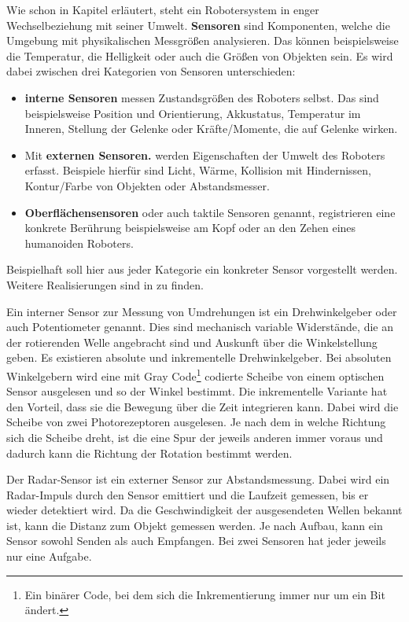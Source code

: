Wie schon in Kapitel  erläutert, steht ein Robotersystem in enger Wechselbeziehung mit seiner Umwelt. \textbf{Sensoren} sind Komponenten, welche die Umgebung mit physikalischen Messgrößen analysieren. Das können beispielsweise die Temperatur, die Helligkeit oder auch die Größen von Objekten sein. Es wird dabei zwischen drei Kategorien von Sensoren unterschieden:
\begin{itemize}
\item \textbf{interne Sensoren} messen Zustandsgrößen des Roboters selbst. Das sind beispielsweise Position und Orientierung, Akkustatus, Temperatur im Inneren, Stellung der Gelenke oder Kräfte/Momente, die auf Gelenke wirken.
\item Mit \textbf{externen Sensoren.} werden Eigenschaften der Umwelt des Roboters erfasst. Beispiele hierfür sind Licht, Wärme, Kollision mit Hindernissen, Kontur/Farbe von Objekten oder Abstandsmesser. 
\item \textbf{Oberflächensensoren} oder auch taktile Sensoren genannt, registrieren eine konkrete Berührung beispielsweise am Kopf oder an den Zehen eines humanoiden Roboters.
\end{itemize}
Beispielhaft soll hier aus jeder Kategorie ein konkreter Sensor vorgestellt werden. Weitere Realisierungen sind in \cite{Haun2007} zu finden.

Ein interner Sensor zur Messung von Umdrehungen ist ein Drehwinkelgeber oder auch Potentiometer genannt. Dies sind mechanisch variable Widerstände, die an der rotierenden Welle angebracht sind und Auskunft über die Winkelstellung geben. Es existieren absolute und inkrementelle Drehwinkelgeber. Bei absoluten Winkelgebern wird eine mit Gray Code\footnote{Ein binärer Code, bei dem sich die Inkrementierung immer nur um ein Bit ändert.} codierte Scheibe von einem optischen Sensor ausgelesen und so der Winkel bestimmt. Die inkrementelle Variante hat den Vorteil, dass sie die Bewegung über die Zeit integrieren kann. Dabei wird die Scheibe von zwei Photorezeptoren ausgelesen. Je nach dem in welche Richtung sich die Scheibe dreht, ist die eine Spur der jeweils anderen immer voraus und dadurch kann die Richtung der Rotation bestimmt werden.

Der Radar-Sensor ist ein externer Sensor zur Abstandsmessung. Dabei wird ein Radar-Impuls durch den Sensor emittiert und die Laufzeit gemessen, bis er wieder detektiert wird. Da die Geschwindigkeit der ausgesendeten Wellen bekannt ist, kann die Distanz zum Objekt gemessen werden. Je nach Aufbau, kann ein Sensor sowohl Senden als auch Empfangen. Bei zwei Sensoren hat jeder jeweils nur eine Aufgabe.

